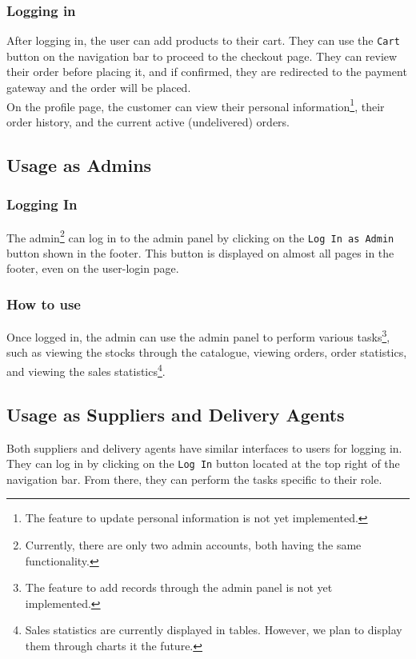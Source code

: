 \documentclass[12pt]{report}
\begin{document}
    \subsubsection*{Logging in}
    After logging in, the user can add products to their cart.
    They can use the \texttt{Cart} button on the navigation bar to proceed to the checkout page.
    They can review their order before placing it, and if confirmed, they are redirected to the payment gateway and the order will be placed.
    \vspace*{10pt} \\
    On the profile page, the customer can view their personal information\footnote{
        The feature to update personal information is not yet implemented.
    }, their order history, and the current active (undelivered) orders.

    \subsection*{Usage as Admins}
    \subsubsection*{Logging In}
    The admin\footnote{
        Currently, there are only two admin accounts, both having the same functionality.
    } can log in to the admin panel by clicking on the \texttt{Log In as Admin} button shown in the footer.
    This button is displayed on almost all pages in the footer, even on the user-login page.

    \subsubsection*{How to use}
    Once logged in, the admin can use the admin panel to perform various tasks\footnote{
        The feature to add records through the admin panel is not yet implemented.
    }, such as viewing the stocks through the catalogue, viewing orders, order statistics,
    and viewing the sales statistics\footnote{
        Sales statistics are currently displayed in tables. However, we plan to display them through charts
        it the future.
    }.

    \subsection*{Usage as Suppliers and Delivery Agents}
    Both suppliers and delivery agents have similar interfaces to users for logging in.
    They can log in by clicking on the \texttt{Log In} button located at the top right of the navigation bar.
    From there, they can perform the tasks specific to their role.
\end{document}
